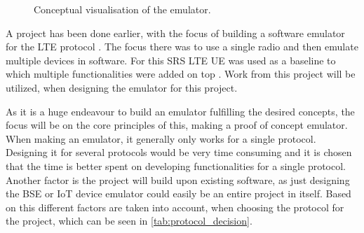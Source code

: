 \begin{figure}
\centering
\resizebox{0.5\textwidth}{!}{
}
\caption{Conceptual visualisation of the emulator.}
\label{fig:intro_fig}
\end{figure}

A project has been done earlier, with the focus of building a software emulator for the LTE protocol \citep{thesis_report}. The focus there was to use a single radio and then emulate multiple devices in software. For this SRS LTE UE was used as a baseline to which multiple functionalities were added on top \citep{thesis_report}. Work from this project will be utilized, when designing the emulator for this project.

As it is a huge endeavour to build an emulator fulfilling the desired concepts, the focus will be on the core principles of this, making a proof of concept emulator. When making an emulator, it generally only works for a single protocol. Designing it for several protocols would be very time consuming and it is chosen that the time is better spent on developing functionalities for a single protocol. Another factor is the project will build upon existing software, as just designing the \gls{BSE} or \gls{IoT} device emulator could easily be an entire project in itself. Based on this different factors are taken into account, when choosing the protocol for the project, which can be seen in \autoref{tab:protocol_decision}.

